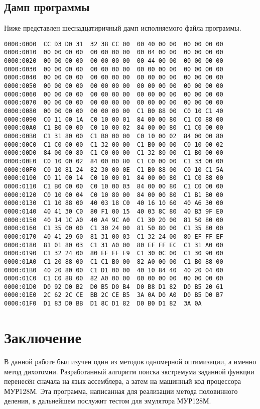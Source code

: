 \documentclass[14pt]{report}
\begin{document}
\section{Дамп программы}
Ниже представлен шеснадцатиричный дамп исполняемого файла программы.
\begin{verbatim}
0000:0000  CC D3 D0 31  32 38 CC 00  00 40 00 00  00 00 00 00
0000:0010  00 00 00 00  00 00 00 00  00 04 00 00  00 00 00 00
0000:0020  00 00 00 00  00 00 00 00  00 44 00 00  00 00 00 00
0000:0030  00 00 00 00  00 00 00 00  00 00 00 00  00 00 00 00
0000:0040  00 00 00 00  00 00 00 00  00 00 00 00  00 00 00 00
0000:0050  00 00 00 00  00 00 00 00  00 00 00 00  00 00 00 00
0000:0060  00 00 00 00  00 00 00 00  00 00 00 00  00 00 00 00
0000:0070  00 00 00 00  00 00 00 00  00 00 00 00  00 00 00 00
0000:0080  00 00 00 00  00 00 00 00  C1 B0 88 00  C0 10 C1 40
0000:0090  C0 11 00 1A  C0 10 00 01  84 00 00 80  C1 C0 88 00
0000:00A0  C1 B0 00 00  C0 10 00 02  84 00 00 80  C1 C0 00 00
0000:00B0  C1 31 80 00  C1 B0 00 00  C0 10 00 02  84 00 00 80
0000:00C0  C1 C0 00 00  C1 32 00 00  C1 B0 00 00  C0 10 00 02
0000:00D0  84 00 00 80  C1 C0 00 00  C1 32 80 00  C1 B0 00 00
0000:00E0  C0 10 00 02  84 00 00 80  C1 C0 00 00  C1 33 00 00
0000:00F0  C0 10 81 24  82 30 00 0E  C1 B0 88 00  C0 10 C1 5A
0000:0100  C0 11 00 14  C0 10 00 01  84 00 00 80  C1 C0 88 00
0000:0110  C1 B0 00 00  C0 10 00 03  84 00 00 80  C1 C0 00 00
0000:0120  C0 10 00 04  C0 10 80 00  84 00 00 80  C1 B1 B0 00
0000:0130  C1 10 88 00  40 03 18 C0  40 16 10 60  40 A6 30 00
0000:0140  40 41 30 C0  80 F1 00 15  40 03 8C 80  40 B3 9F E0
0000:0150  40 14 1C A0  40 A4 9C A0  C1 30 20 00  81 50 80 00
0000:0160  C1 35 00 00  C1 30 24 00  81 50 80 00  C1 35 80 00
0000:0170  40 41 29 60  81 31 00 03  C1 32 24 00  80 EF FF EF
0000:0180  81 01 80 03  C1 31 A0 00  80 EF FF EC  C1 31 A0 00
0000:0190  C1 32 24 00  80 EF FF E9  C1 30 0C 00  C1 30 90 00
0000:01A0  C1 20 88 00  C1 C1 B0 00  82 A0 00 00  C1 B0 88 00
0000:01B0  40 20 80 00  C1 D1 00 00  40 10 84 40  40 20 04 00
0000:01C0  C1 C0 88 00  82 A0 00 00  00 00 00 00  00 00 00 00
0000:01D0  D0 92 D0 B2  D0 B5 D0 B4  D0 B8 D1 82  D0 B5 20 61
0000:01E0  2C 62 2C CE  BB 2C CE B5  3A 0A D0 A0  D0 B5 D0 B7
0000:01F0  D1 83 D0 BB  D1 8C D1 82  D0 B0 D1 82  3A 0A
\end{verbatim}
\chapter*{Заключение}
В данной работе был изучен один из методов одномерной оптимизации, а именно метод дихотомии. Разработанный алгоритм поиска экстремума заданной функции перенесён сначала на язык ассемблера, а затем на машинный код процессора МУР128М. Эта программа, написанная для реализации метода половинного деления, в дальнейшем послужит тестом для эмулятора МУР128М.
\end{document}
